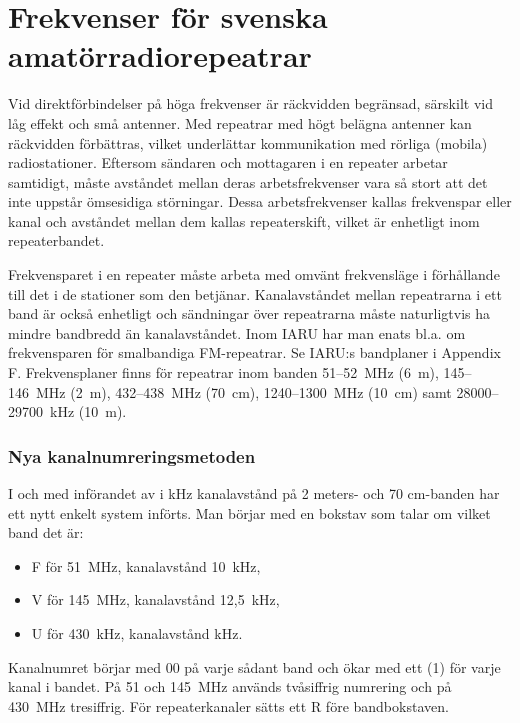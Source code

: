 \chapter{Frekvenser för svenska amatörradiorepeatrar}
Vid direktförbindelser på höga frekvenser är räckvidden begränsad,
särskilt vid låg effekt och små antenner.
Med repeatrar med högt belägna antenner kan räckvidden förbättras,
vilket underlättar kommunikation med rörliga (mobila) radiostationer.
Eftersom sändaren och mottagaren i en repeater arbetar samtidigt, måste
avståndet mellan deras arbetsfrekvenser vara så stort att det inte uppstår
ömsesidiga störningar.
Dessa arbetsfrekvenser kallas frekvenspar eller kanal och avståndet mellan dem
kallas repeaterskift, vilket är enhetligt inom repeaterbandet.

Frekvensparet i en repeater måste arbeta med omvänt frekvensläge i förhållande
till det i de stationer som den betjänar.
Kanalavståndet mellan repeatrarna i ett band är också enhetligt och sändningar
över repeatrarna måste naturligtvis ha mindre bandbredd än kanalavståndet.
Inom IARU har man enats bl.a. om frekvensparen för smalbandiga FM-repeatrar.
Se IARU:s bandplaner i Appendix F.
Frekvensplaner finns för repeatrar inom banden 51--52~MHz (6~m), 145--146~MHz
(2~m), 432--438~MHz (70~cm), 1240--1300~MHz (10~cm) samt 28000--29700~kHz (10~m).

\subsection{Nya kanalnumreringsmetoden}
I och med införandet av i kHz kanalavstånd på 2 meters- och 70 cm-banden har
ett nytt enkelt system införts.
Man börjar med en bokstav som talar om vilket band det är:
\begin{itemize}
  \item F för 51~MHz, kanalavstånd 10~kHz,
  \item V för 145~MHz, kanalavstånd 12,5~kHz, 
  \item U för 430~kHz, kanalavstånd kHz.
\end{itemize}
Kanalnumret börjar med 00 på varje sådant band och ökar med ett (1) för varje
kanal i bandet.
På 51 och 145~MHz används tvåsiffrig numrering och på 430~MHz tresiffrig.
För repeaterkanaler sätts ett R före bandbokstaven.

